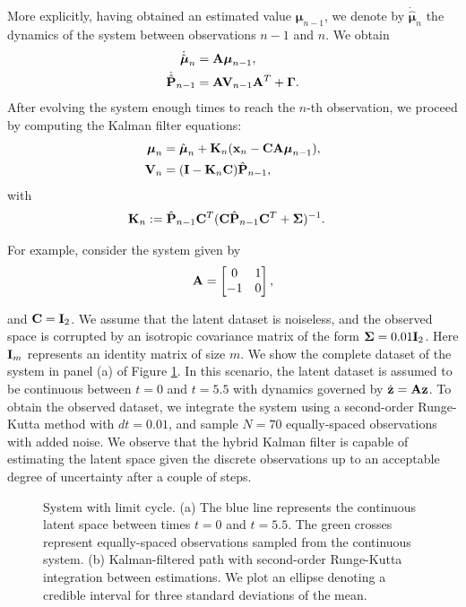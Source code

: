 \documentclass[12pt, oneside]{book}
\numberwithin{equation}{section}
\newcommand{\x}{{\bf x}}
\begin{document}
{More explicitly, having obtained an estimated value $\boldsymbol{\mu}_{n-1}$, we denote by $\dot{\hat{\boldsymbol{\mu}}}_n$ the dynamics of the system between observations $n-1$ and $n$. We obtain
\begin{align}
	\dot{\hat{\boldsymbol{\mu}}}_n &= {\bf A}\boldsymbol{\mu}_{n-1},\\
	\dot{\hat{{\bf P}}}_{n-1} &= {\bf A}{\bf V}_{n-1}{\bf A}^T + \boldsymbol{\Gamma}.
\end{align}
After evolving the system enough times to reach the $n$-th observation, we proceed by computing the Kalman filter equations:
\begin{align}
	\boldsymbol{\mu}_n &= \hat{\boldsymbol{\mu}}_n + {\bf K}_n(\x_n -{\bf C}{\bf A}\boldsymbol\mu_{n-1}),\\
	{\bf V}_n &=  ({\bf I} - {\bf K}_n{\bf C})\hat{\bf P}_{n-1},
\end{align}	
with
\begin{align}
	{\bf K}_n &:= \hat{\bf P}_{n-1}{\bf C}^T({\bf C} \hat{\bf P}_{n-1}{\bf C}^T + \boldsymbol\Sigma)^{-1}.
\end{align}

For example, consider the system given by
\begin{align}
	{\bf A} = \begin{bmatrix}
		0 & 1\\
		-1 & 0
	\end{bmatrix},
\end{align}

and ${\bf C} = {\bf I}_2$. We assume that the latent dataset is noiseless, and the observed space is corrupted by an isotropic covariance matrix of the form $\boldsymbol{\Sigma} = 0.01 {\bf I}_2$. Here ${\bf I}_m$ represents an identity matrix of size $m$. We show the complete dataset of the system in panel (a) of Figure \ref{fig:hybrid-kalman-filter}. In this scenario, the latent dataset is assumed to be continuous between $t=0$ and $t=5.5$ with dynamics governed by $\dot{\bf z} = {\bf A z}$. To obtain the observed dataset, we integrate the system using a second-order Runge-Kutta method with $dt=0.01$, and sample $N=70$ equally-spaced observations with added noise. We observe that the hybrid Kalman filter is capable of estimating the latent space given the discrete observations up to an acceptable degree of uncertainty after a couple of steps.

\begin{figure}
	\hfill
	\hfill
	\hfill
	\caption{System with limit cycle. (a) The blue line represents the continuous latent space between times $t=0$ and $t=5.5$. The green crosses represent equally-spaced observations sampled from the continuous system. (b) Kalman-filtered path with second-order Runge-Kutta integration between estimations. We plot an ellipse denoting a credible interval for three standard deviations of the mean.}
	\label{fig:hybrid-kalman-filter}
\end{figure}


}
\end{document}
